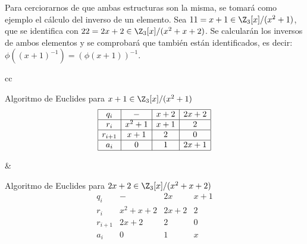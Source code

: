 \begin{ejs}
        Para cerciorarnos de que ambas estructuras son la misma, se tomará como ejemplo el cálculo del inverso de un elemento. Sea $11 = x + 1 \in \Z_3[x]/(x^2 + 1)$, que se identifica con  $22 = 2x + 2 \in \Z_3[x]/(x^2 + x + 2)$. Se calcularán los inversos de ambos elementos y se comprobará que también están identificados, es decir: $\phi( (x + 1)^{-1}) = (\phi(x + 1))^{-1}$.

        
        \begin{center}\vspace{-0.3em}
            \begin{tabular}{cc}
                \begin{minipage}[t]{0.42\textwidth}
                    \centering
                    Algoritmo de Euclides para $x +1 \in \Z_3[x]/(x^2 + 1)$
                   \[
                        \begin{array}{|c|c|c|c|}
                        \hline
                        q_i     &  -          & x + 2     & 2x + 2\\
                        \hline
                        r_i    &  x^2 + 1 & x +1& 2  \\
                        \hline
                        r_{i+1} &  x +1  & 2           &  0     \\
                        \hline
                        a_i     &0            &  1          &  2x + 1       \\
                        \hline
                    \end{array}
                    \]
                \end{minipage}
                &
                \begin{minipage}[t]{0.45\textwidth}
                    \centering
                    Algoritmo de Euclides para $2x + 2 \in \Z_3[x]/(x^2 + x + 2)$
                    \[
                    \begin{array}{|c|c|c|c|}
                        \hline
                        q_i     &  -          & 2x      & x + 1\\
                        \hline
                        r_i    &  x^2 + x + 2 & 2x + 2& 2\\
                        \hline
                        r_{i+1} &  2x + 2      & 2           &  0     \\
                        \hline
                        a_i     &0            &  1          &  x     \\

\end{array}\]
\end{minipage}
\end{tabular}
\end{center}
\end{ejs}
